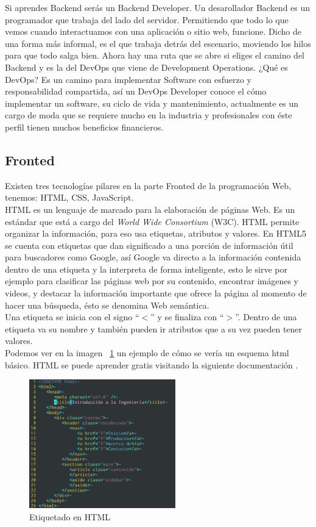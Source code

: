 \documentclass[twocolumns,a4paper]{IEEEtran}
\begin{document}
Si aprendes Backend serás un Backend Developer.
Un desarollador Backend es un programador que trabaja del lado del servidor.
Permitiendo que todo lo que vemos cuando interactuamos con una aplicación o
sitio web, funcione. Dicho de una forma más informal, es el que trabaja detrás
del escenario, moviendo los hilos para que todo salga bien.
Ahora hay una ruta que se abre si eliges el camino del Backend y es la del
DevOps que viene de Development Operations. ¿Qué es DevOps? Es un camino para
implementar Software con esfuerzo y responsabilidad compartida, así un DevOps
Developer conoce el cómo implementar un software, su ciclo de vida y
mantenimiento, actualmente es un cargo de moda que se requiere mucho en la
industria y profesionales con éste perfil tienen muchos beneficios
financieros.\\


\subsection{Fronted}
Existen tres tecnologías pilares en la parte Fronted de la programación Web,
tenemos: HTML, CSS, JavaScript.\\
HTML es un lenguaje de marcado para la elaboración de páginas Web. Es un
estándar que está a cargo del \textit{World Wide Consortium} (W3C). HTML
permite organizar la información, para eso usa etiquetas, atributos y valores.
En HTML5 se cuenta con etiquetas que dan significado a una porción de
información útil para buscadores como Google, así Google va directo a la
información contenida dentro de una etiqueta y la interpreta de forma
inteligente, esto le sirve por ejemplo para clasificar las páginas web por su
contenido, encontrar imágenes y videos, y destacar la información importante
que ofrece la página al momento de hacer una búsqueda, ésto se denomina Web
semántica.\\
Una etiqueta se inicia con el signo ``$<$'' y se finaliza con ``$>$''. Dentro
de una etiqueta va su nombre y también pueden ir atributos que a su vez pueden
tener valores.\\
Podemos ver en la imagen ~\ref{fig:html_etiquetado} un ejemplo de cómo se vería
un esquema html básico. HTML se puede aprender gratis visitando la siguiente
documentación \cite{HTMLw3:2018:online}.

\begin{figure}[ht]
   \centering
   \includegraphics[width=2.5in]{html}
   \caption{Etiquetado en HTML}
   \label{fig:html_etiquetado}
\end{figure}
\end{document}
